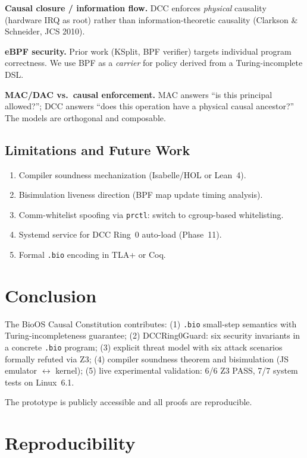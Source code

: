 \documentclass[11pt,a4paper,twoside]{article}
\begin{document}
\textbf{Causal closure / information flow.}
DCC enforces \emph{physical} causality (hardware IRQ as root) rather than
information-theoretic causality (Clarkson \& Schneider, JCS 2010).

\textbf{eBPF security.}
Prior work (KSplit, BPF verifier) targets individual program correctness.
We use BPF as a \emph{carrier} for policy derived from a Turing-incomplete DSL.

\textbf{MAC/DAC vs.\ causal enforcement.}
MAC answers ``is this principal allowed?''; DCC answers ``does this operation
have a physical causal ancestor?'' The models are orthogonal and composable.

\subsection{Limitations and Future Work}

\begin{enumerate}[topsep=2pt,itemsep=2pt]
  \item Compiler soundness mechanization (Isabelle/HOL or Lean~4).
  \item Bisimulation liveness direction (BPF map update timing analysis).
  \item Comm-whitelist spoofing via \texttt{prctl}: switch to cgroup-based whitelisting.
  \item Systemd service for DCC Ring~0 auto-load (Phase~11).
  \item Formal \texttt{.bio} encoding in TLA+ or Coq.
\end{enumerate}

\section{Conclusion}

The BioOS Causal Constitution contributes:
(1) \texttt{.bio} small-step semantics with Turing-incompleteness guarantee;
(2) DCCRing0Guard: six security invariants in a concrete \texttt{.bio} program;
(3) explicit threat model with six attack scenarios formally refuted via Z3;
(4) compiler soundness theorem and bisimulation (JS emulator $\leftrightarrow$ kernel);
(5) live experimental validation: 6/6 Z3 PASS, 7/7 system tests on Linux~6.1.

The prototype is publicly accessible and all proofs are reproducible.

\appendix

\section{Reproducibility}
\end{document}

